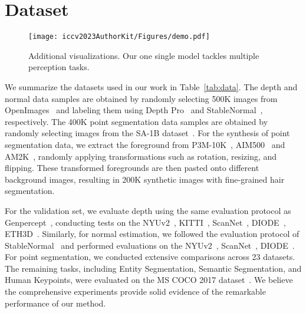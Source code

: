 \section{Dataset}
\begin{figure*}[htbp]
  \centering
  \texttt{[image: iccv2023AuthorKit/Figures/demo.pdf]}
  \caption{
   Additional visualizations. Our one single model tackles multiple perception tasks.
  }
  \label{fig:demo}
\end{figure*}

\label{appendix:dataset}
We summarize the datasets used in our work in Table~\ref{tab:data}. The depth and normal data samples are obtained by randomly selecting 500K images from OpenImages~\cite{kuznetsova2020open} and labeling them using Depth Pro~\cite{bochkovskii2024depth} and StableNormal~\cite{ye2024stablenormal}, respectively. The 400K point segmentation data samples are obtained by randomly selecting images from the SA-1B dataset~\cite{kirillov2023segment}. For the synthesis of point segmentation data, we extract the foreground from P3M-10K~\cite{li2021privacy}, AIM500~\cite{li2021deep} and AM2K~\cite{li2022bridging}, randomly applying transformations such as rotation, resizing, and flipping. These transformed foregrounds are then pasted onto different background images, resulting in 200K synthetic images with fine-grained hair segmentation.

For the validation set, we evaluate depth using the same evaluation protocol as Genpercept~\cite{xu2024diffusion}, conducting tests on the NYUv2~\cite{nyu}, KITTI~\cite{kitti}, ScanNet~\cite{scannet}, DIODE~\cite{diode}, ETH3D~\cite{eth3d}. Similarly, for normal estimation, we followed the evaluation protocol of StableNormal~\cite{ye2024stablenormal} and performed evaluations on the NYUv2~\cite{nyu}, ScanNet~\cite{scannet}, DIODE~\cite{diode}. For point segmentation, we conducted extensive comparisons across 23 datasets. The remaining tasks, including Entity Segmentation, Semantic Segmentation, and Human Keypoints, were evaluated on the MS COCO 2017 dataset~\cite{lin2015microsoftcococommonobjects}. We believe the comprehensive experiments provide solid evidence of the remarkable performance of our method.

